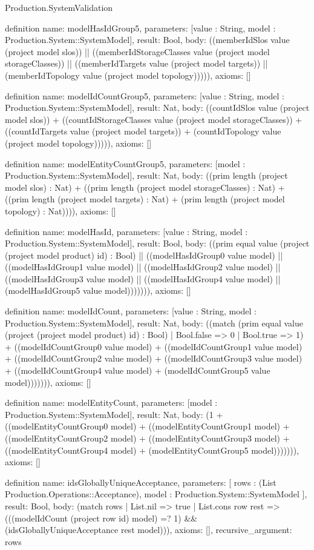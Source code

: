 \begin{lexlean}{Production.SystemValidation}
\begin{semanticmodule}
definition{
  name: modelHasIdGroup5,
  parameters: [value : String, model : Production.System::SystemModel],
  result: Bool,
  body: ((memberIdSlos value (project model slos)) || ((memberIdStorageClasses value (project model storageClasses)) || ((memberIdTargets value (project model targets)) || (memberIdTopology value (project model topology))))),
  axioms: []
}

definition{
  name: modelIdCountGroup5,
  parameters: [value : String, model : Production.System::SystemModel],
  result: Nat,
  body: ((countIdSlos value (project model slos)) + ((countIdStorageClasses value (project model storageClasses)) + ((countIdTargets value (project model targets)) + (countIdTopology value (project model topology))))),
  axioms: []
}

definition{
  name: modelEntityCountGroup5,
  parameters: [model : Production.System::SystemModel],
  result: Nat,
  body: ((prim length (project model slos) : Nat) + ((prim length (project model storageClasses) : Nat) + ((prim length (project model targets) : Nat) + (prim length (project model topology) : Nat)))),
  axioms: []
}

definition{
  name: modelHasId,
  parameters: [value : String, model : Production.System::SystemModel],
  result: Bool,
  body: ((prim equal value (project (project model product) id) : Bool) || ((modelHasIdGroup0 value model) || ((modelHasIdGroup1 value model) || ((modelHasIdGroup2 value model) || ((modelHasIdGroup3 value model) || ((modelHasIdGroup4 value model) || (modelHasIdGroup5 value model))))))),
  axioms: []
}

definition{
  name: modelIdCount,
  parameters: [value : String, model : Production.System::SystemModel],
  result: Nat,
  body: ((match (prim equal value (project (project model product) id) : Bool)
    | Bool.false => 0
    | Bool.true => 1) + ((modelIdCountGroup0 value model) + ((modelIdCountGroup1 value model) + ((modelIdCountGroup2 value model) + ((modelIdCountGroup3 value model) + ((modelIdCountGroup4 value model) + (modelIdCountGroup5 value model))))))),
  axioms: []
}

definition{
  name: modelEntityCount,
  parameters: [model : Production.System::SystemModel],
  result: Nat,
  body: (1 + ((modelEntityCountGroup0 model) + ((modelEntityCountGroup1 model) + ((modelEntityCountGroup2 model) + ((modelEntityCountGroup3 model) + ((modelEntityCountGroup4 model) + (modelEntityCountGroup5 model))))))),
  axioms: []
}

definition{
  name: idsGloballyUniqueAcceptance,
  parameters: [
    rows : (List Production.Operations::Acceptance),
    model : Production.System::SystemModel
  ],
  result: Bool,
  body: (match rows
    | List.nil => true
    | List.cons row rest => (((modelIdCount (project row id) model) =? 1) && (idsGloballyUniqueAcceptance rest model))),
  axioms: [],
  recursive_argument: rows
}


\end{semanticmodule}
\end{lexlean}
